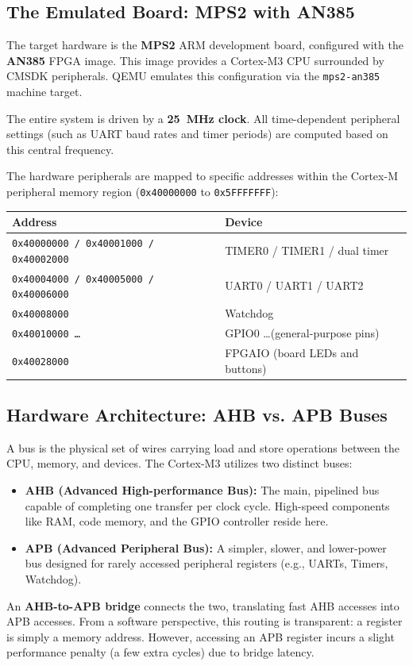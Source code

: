 \subsection{The Emulated Board: MPS2 with AN385}
The target hardware is the \textbf{MPS2} ARM development board, configured with the \textbf{AN385} FPGA image. This image provides a Cortex-M3 CPU surrounded by CMSDK peripherals. QEMU emulates this configuration via the \texttt{mps2-an385} machine target.

The entire system is driven by a \textbf{25~MHz clock}. All time-dependent peripheral settings (such as UART baud rates and timer periods) are computed based on this central frequency.

The hardware peripherals are mapped to specific addresses within the Cortex-M peripheral memory region (\texttt{0x40000000} to \texttt{0x5FFFFFFF}):
\begin{table}[h!]
    \centering
    \begin{tabular}{ll}
        \toprule
        \textbf{Address} & \textbf{Device} \\
        \midrule
        \texttt{0x40000000 / 0x40001000 / 0x40002000} & TIMER0 / TIMER1 / dual timer \\
        \texttt{0x40004000 / 0x40005000 / 0x40006000} & UART0 / UART1 / UART2 \\
        \texttt{0x40008000} & Watchdog \\
        \texttt{0x40010000 \dots} & GPIO0 \dots (general-purpose pins) \\
        \texttt{0x40028000} & FPGAIO (board LEDs and buttons) \\
        \bottomrule
    \end{tabular}
\end{table}

\subsection{Hardware Architecture: AHB vs. APB Buses}
A bus is the physical set of wires carrying load and store operations between the CPU, memory, and devices. The Cortex-M3 utilizes two distinct buses:
\begin{itemize}
    \item \textbf{AHB (Advanced High-performance Bus):} The main, pipelined bus capable of completing one transfer per clock cycle. High-speed components like RAM, code memory, and the GPIO controller reside here.
    \item \textbf{APB (Advanced Peripheral Bus):} A simpler, slower, and lower-power bus designed for rarely accessed peripheral registers (e.g., UARTs, Timers, Watchdog).
\end{itemize}
An \textbf{AHB-to-APB bridge} connects the two, translating fast AHB accesses into APB accesses. From a software perspective, this routing is transparent: a register is simply a memory address. However, accessing an APB register incurs a slight performance penalty (a few extra cycles) due to bridge latency.

